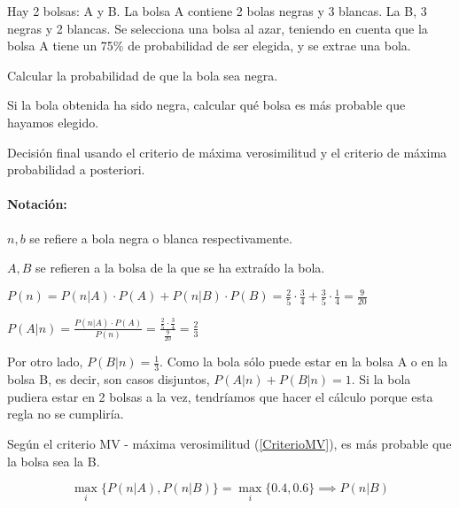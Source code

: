 \begin{problem}[5]
Hay 2 bolsas: A y B. La bolsa A contiene 2 bolas negras y 3 blancas. La B, 3 negras y 2 blancas. Se selecciona una bolsa al azar, teniendo en cuenta que la bolsa A tiene un 75\% de probabilidad de ser elegida, y se extrae una bola.

\ppart Calcular la probabilidad de que la bola sea negra.

\ppart Si la bola obtenida ha sido negra, calcular qué bolsa es más probable que hayamos elegido.

\ppart Decisión final usando el criterio de máxima verosimilitud y el criterio de máxima probabilidad a posteriori.


\solution
\paragraph{Notación:\\} 
$n,b$ se refiere a bola negra o blanca respectivamente.

$A,B$ se refieren a la bolsa de la que se ha extraído la bola.

\spart $P(n) = P(n | A)·P(A) + P(n|B)·P(B) = \frac{2}{5}·\frac{3}{4} + \frac{3}{5} · \frac{1}{4} = \frac{9}{20}$

\spart $P(A|n) = \frac{P(n|A)·P(A)}{P(n)} = \frac{\frac{2}{5}·\frac{3}{4}}{\frac{9}{20}} = \frac{2}{3}$

Por otro lado, $P(B|n) = \frac{1}{3}$. Como la bola sólo puede estar en la bolsa A o en la bolsa B, es decir, son casos disjuntos, $P(A|n) + P(B|n) = 1$. Si la bola pudiera estar en 2 bolsas a la vez, tendríamos que hacer el cálculo porque esta regla no se cumpliría.

\spart

Según el criterio MV - máxima verosimilitud (\ref{CriterioMV}), es más probable que la bolsa sea la B.

\[
\max_i\{P(n|A),P(n|B)\} = \max_i\{0.4,0.6\}\implies P(n|B)
\]

\end{problem}